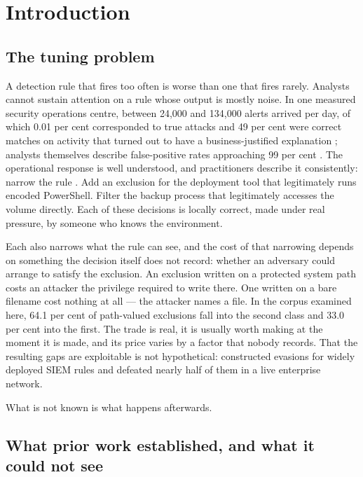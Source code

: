 \section{Introduction}
\label{sec:intro}

\subsection{The tuning problem}

A detection rule that fires too often is worse than one that fires rarely. Analysts cannot sustain attention on a rule whose output is mostly noise. In one measured security operations centre, between 24,000 and 134,000 alerts arrived per day, of which 0.01 per cent corresponded to true attacks and 49 per cent were correct matches on activity that turned out to have a business-justified explanation \citep{yang2024}; analysts themselves describe false-positive rates approaching 99 per cent \citep{alahmadi2022}. The operational response is well understood, and practitioners describe it consistently: narrow the rule \citep{vermeer2023}. Add an exclusion for the deployment tool that legitimately runs encoded PowerShell. Filter the backup process that legitimately accesses the volume directly. Each of these decisions is locally correct, made under real pressure, by someone who knows the environment.

Each also narrows what the rule can see, and the cost of that narrowing depends on something the decision itself does not record: whether an adversary could arrange to satisfy the exclusion. An exclusion written on a protected system path costs an attacker the privilege required to write there. One written on a bare filename cost nothing at all --- the attacker names a file. In the corpus examined here, 64.1 per cent of path-valued exclusions fall into the second class and 33.0 per cent into the first. The trade is real, it is usually worth making at the moment it is made, and its price varies by a factor that nobody records. That the resulting gaps are exploitable is not hypothetical: \citet{uetz2024} constructed evasions for widely deployed SIEM rules and defeated nearly half of them in a live enterprise network.

What is not known is what happens afterwards.

\subsection{What prior work established, and what it could not see}

